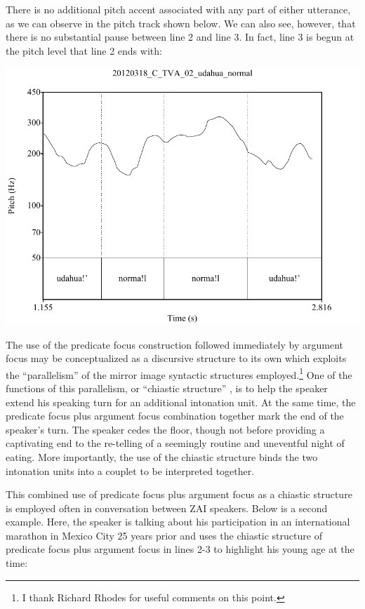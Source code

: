 There is no additional pitch accent associated with any part of either utterance, as we can observe in the pitch track shown below. We can also see, however, that there is no substantial pause between line 2 and line 3. In fact, line 3 is begun at the pitch level that line 2 ends with: 

\vspace{3mm}

\includegraphics[height=.4\textheight]{gudahuanormal}

The use of the predicate focus construction followed immediately by argument focus may be conceptualized as a discursive structure to its own which exploits the ``parallelism'' \citep{jakobson1966,fox1977} of the mirror image syntactic structures employed.\footnote{I thank Richard Rhodes for useful comments on this point.} One of the functions of this parallelism, or ``chiastic structure'' \citep{silverstein1984}, is to help the speaker extend his speaking turn for an additional intonation unit. At the same time, the predicate focus plus argument focus combination together mark the end of the speaker's turn. The speaker cedes the floor, though not before providing a captivating end to the re-telling of a seemingly routine and uneventful night of eating. More importantly, the use of the chiastic structure binds the two intonation units into a couplet to be interpreted together.

This combined use of predicate focus plus argument focus as a chiastic structure is employed often in conversation between ZAI speakers. Below is a second example. Here, the speaker is talking about his participation in an international marathon in Mexico City 25 years prior and uses the chiastic structure of predicate focus plus argument focus in lines 2-3 to highlight his young age at the time:

